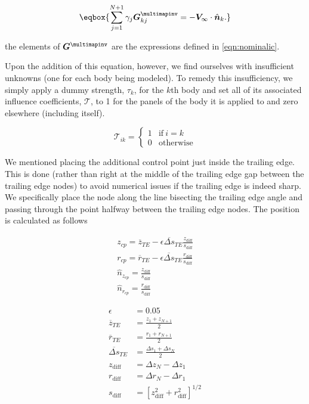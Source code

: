 \begin{equation}
    \eqbox{
    \sum_{j=1}^{N+1} \gamma_j\vect{G}^\multimapinv_{kj} = - \vect{V}_\infty \cdot \hat{\vect{n}}_k.
}
\end{equation}

\where the elements of \(\vect{G}^\multimapinv\) are the expressions defined in \cref{eqn:nominalic}.

Upon the addition of this equation, however, we find ourselves with insufficient unknowns (one for each body being modeled).
%
To remedy this insufficiency, we simply apply a dummy strength, \(\tau_k\), for the \(k\)th body and set all of its associated influence coefficients, \(\mathcal{T}\), to 1 for the panels of the body it is applied to and zero elsewhere (including itself).

\begin{equation}
    \mathcal{T}_{ik} =
        \begin{cases}
            1 & \text{if}~i=k\\
            0 & \text{otherwise}
        \end{cases}
\end{equation}

We mentioned placing the additional control point just inside the trailing edge.
%
This is done (rather than right at the middle of the trailing edge gap between the trailing edge nodes) to avoid numerical issues if the trailing edge is indeed sharp.
%
We specifically place the node along the line bisecting the trailing edge angle and passing through the point halfway between the trailing edge nodes.
%
The position is calculated as follows

\begin{subequations}
    \begin{align}
        z_{cp} = \overline{z}_{TE} - \epsilon \overline{\Delta s}_{TE} \frac{z_\text{diff}}{s_\text{diff}} \\
        r_{cp} = \overline{r}_{TE} - \epsilon \overline{\Delta s}_{TE} \frac{r_\text{diff}}{s_\text{diff}} \\
        \hat{n}_{z_{cp}} = \frac{z_\text{diff}}{s_\text{diff}} \\
        \hat{n}_{r_{cp}} = \frac{r_\text{diff}}{s_\text{diff}}
    \end{align}
\end{subequations}

\where

\begin{align}
    \epsilon &= 0.05 \\
    \overline{z}_{TE} &= \frac{z_1+z_{N+1}}{2}\\
    \overline{r}_{TE} &= \frac{r_1+r_{N+1}}{2}\\
    \overline{\Delta s}_{TE} &= \frac{\Delta s_1+\Delta s_{N}}{2}\\
    z_\text{diff} &= \Delta z_{N} - \Delta z_{1} \\
    r_\text{diff} &= \Delta r_{N} - \Delta r_{1} \\
    s_\text{diff} &= \left[ z_\text{diff}^2 + r_\text{diff}^2\right]^{1/2}
\end{align}

